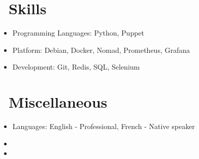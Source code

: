 \documentclass{resume}
\begin{document}
\section{\faCogs\ Skills}
\begin{itemize}[parsep=0.5ex]
  \item Programming Languages: Python, Puppet
  \item Platform: Debian, Docker, Nomad, Prometheus, Grafana
  \item Development: Git, Redis, SQL, Selenium
\end{itemize}

\section{\faInfo\ Miscellaneous}
\begin{itemize}[parsep=0.5ex]
  \item Languages: English - Professional, French - Native speaker
  \item {}
  \item {}
\end{itemize}
\end{document}
